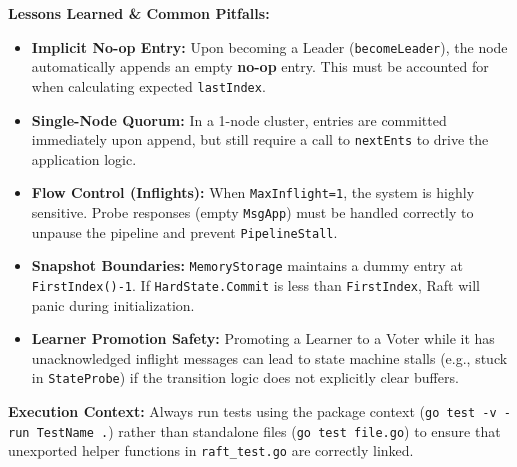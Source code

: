 \documentclass{article}
\theoremstyle{plain}
\theoremstyle{definition}
\theoremstyle{remark}
\begin{document}
{\vspace{0.8em}
\textbf{Lessons Learned \& Common Pitfalls:}
\begin{itemize}
    \item \textbf{Implicit No-op Entry:} Upon becoming a Leader (\texttt{becomeLeader}), the node automatically appends an empty \textbf{no-op} entry. This must be accounted for when calculating expected \texttt{lastIndex}.
    \item \textbf{Single-Node Quorum:} In a 1-node cluster, entries are committed immediately upon append, but still require a call to \texttt{nextEnts} to drive the application logic.
    \item \textbf{Flow Control (Inflights):} When \texttt{MaxInflight=1}, the system is highly sensitive. Probe responses (empty \texttt{MsgApp}) must be handled correctly to unpause the pipeline and prevent \texttt{PipelineStall}.
    \item \textbf{Snapshot Boundaries:} \texttt{MemoryStorage} maintains a dummy entry at \texttt{FirstIndex()-1}. If \texttt{HardState.Commit} is less than \texttt{FirstIndex}, Raft will panic during initialization.
    \item \textbf{Learner Promotion Safety:} Promoting a Learner to a Voter while it has unacknowledged inflight messages can lead to state machine stalls (e.g., stuck in \texttt{StateProbe}) if the transition logic does not explicitly clear buffers.
\end{itemize}

\vspace{0.5em}
\textbf{Execution Context:} 
Always run tests using the package context (\texttt{go test -v -run TestName .}) rather than standalone files (\texttt{go test file.go}) to ensure that unexported helper functions in \texttt{raft\_test.go} are correctly linked.
}

\begin{table}[!t]
\caption{Codebase information.}
\vspace{0.5em}
\label{tab:codebase}
\centering
{}
\end{table}
\end{document}
